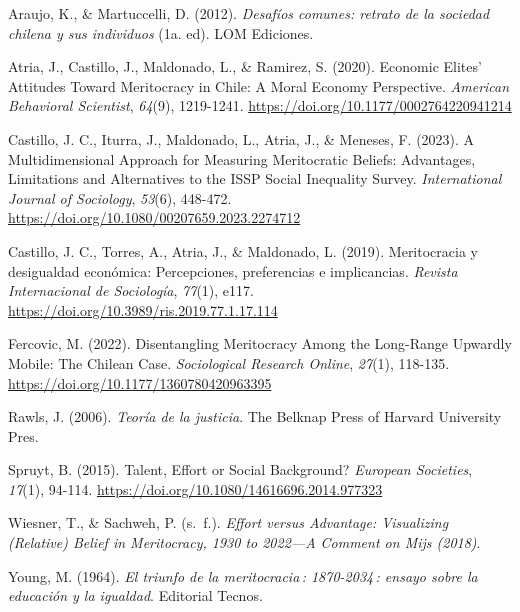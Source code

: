 \documentclass[
  spanish,
  a4paper,
  oneside]{scrbook}
\newlength{\cslhangindent}
\newenvironment{CSLReferences}[2] %
 {\begin{list}{}{%
  \setlength{\itemindent}{0pt}
  \setlength{\leftmargin}{0pt}
  \setlength{\parsep}{0pt}
  \ifodd #1
   \setlength{\leftmargin}{\cslhangindent}
   \setlength{\itemindent}{-1\cslhangindent}
  \fi
  \setlength{\itemsep}{#2\baselineskip}}}
 {\end{list}}
\begin{document}
\protect{}\label{refs}
\begin{CSLReferences}{1}{0}
Araujo, K., \& Martuccelli, D. (2012). \emph{{Desafíos comunes: retrato
de la sociedad chilena y sus individuos}} (1a. ed). LOM Ediciones.

Atria, J., Castillo, J., Maldonado, L., \& Ramirez, S. (2020). Economic
{Elites}' {Attitudes Toward Meritocracy} in {Chile}: {A Moral Economy
Perspective}. \emph{American Behavioral Scientist}, \emph{64}(9),
1219-1241. \url{https://doi.org/10.1177/0002764220941214}

Castillo, J. C., Iturra, J., Maldonado, L., Atria, J., \& Meneses, F.
(2023). A {Multidimensional Approach} for {Measuring Meritocratic
Beliefs}: {Advantages}, {Limitations} and {Alternatives} to the {ISSP
Social Inequality Survey}. \emph{International Journal of Sociology},
\emph{53}(6), 448-472.
\url{https://doi.org/10.1080/00207659.2023.2274712}

Castillo, J. C., Torres, A., Atria, J., \& Maldonado, L. (2019).
{Meritocracia y desigualdad económica: Percepciones, preferencias e
implicancias}. \emph{Revista Internacional de Sociología}, \emph{77}(1),
e117. \url{https://doi.org/10.3989/ris.2019.77.1.17.114}

Fercovic, M. (2022). Disentangling {Meritocracy Among} the {Long-Range
Upwardly Mobile}: {The Chilean Case}. \emph{Sociological Research
Online}, \emph{27}(1), 118-135.
\url{https://doi.org/10.1177/1360780420963395}

Rawls, J. (2006). \emph{{Teoría de la justicia}}. The Belknap Press of
Harvard University Pres.

Spruyt, B. (2015). Talent, {Effort} or {Social Background}?
\emph{European Societies}, \emph{17}(1), 94-114.
\url{https://doi.org/10.1080/14616696.2014.977323}

Wiesner, T., \& Sachweh, P. (s.~f.). \emph{Effort versus {Advantage}:
{Visualizing} ({Relative}) {Belief} in {Meritocracy}, 1930 to 2022---{A
Comment} on {Mijs} (2018)}.

Young, M. (1964). \emph{{El triunfo de la meritocracia : 1870-2034 :
ensayo sobre la educación y la igualdad}}. Editorial Tecnos.

\end{CSLReferences}
\end{document}
